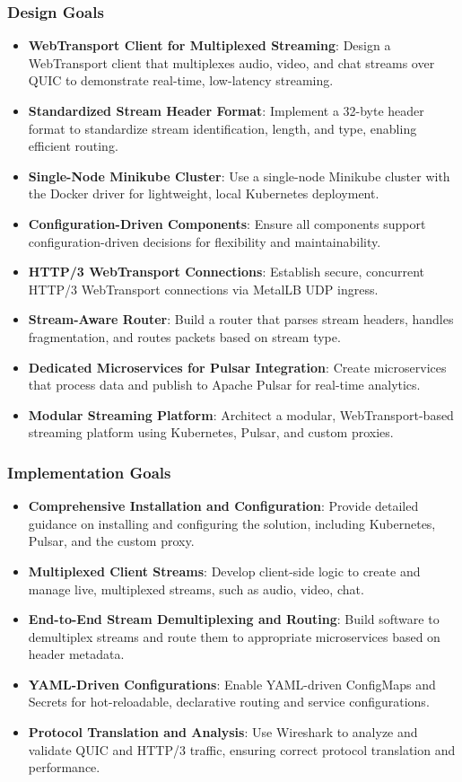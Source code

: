 \subsubsection*{Design Goals}
\begin{itemize}
    \item \textbf{WebTransport Client for Multiplexed Streaming}: Design a WebTransport client that multiplexes audio, video, and chat streams over QUIC to demonstrate real-time, low-latency streaming.
    \item \textbf{Standardized Stream Header Format}: Implement a 32-byte header format to standardize stream identification, length, and type, enabling efficient routing.
    \item \textbf{Single-Node Minikube Cluster}: Use a single-node Minikube cluster with the Docker driver for lightweight, local Kubernetes deployment.
    \item \textbf{Configuration-Driven Components}: Ensure all components support configuration-driven decisions for flexibility and maintainability.
    \item \textbf{HTTP/3 WebTransport Connections}: Establish secure, concurrent HTTP/3 WebTransport connections via MetalLB UDP ingress.
    \item \textbf{Stream-Aware Router}: Build a router that parses stream headers, handles fragmentation, and routes packets based on stream type.
    \item \textbf{Dedicated Microservices for Pulsar Integration}: Create microservices that process data and publish to Apache Pulsar for real-time analytics.
    \item \textbf{Modular Streaming Platform}: Architect a modular, WebTransport-based streaming platform using Kubernetes, Pulsar, and custom proxies.
\end{itemize}

\subsubsection*{Implementation Goals}
\begin{itemize}
    \item \textbf{Comprehensive Installation and Configuration}: Provide detailed guidance on installing and configuring the solution, including Kubernetes, Pulsar, and the custom proxy.
    \item \textbf{Multiplexed Client Streams}: Develop client-side logic to create and manage live, multiplexed streams, such as audio, video, chat.
    \item \textbf{End-to-End Stream Demultiplexing and Routing}: Build software to demultiplex streams and route them to appropriate microservices based on header metadata.
    \item \textbf{YAML-Driven Configurations}: Enable YAML-driven ConfigMaps and Secrets for hot-reloadable, declarative routing and service configurations.
    \item \textbf{Protocol Translation and Analysis}: Use Wireshark to analyze and validate QUIC and HTTP/3 traffic, ensuring correct protocol translation and performance.
\end{itemize}




